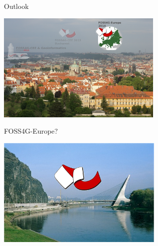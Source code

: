 \documentclass{beamer}
\begin{document}
\begin{frame}{Outlook}{}
  \begin{center}
    \includegraphics[height=200px]{imgs/outlook3.jpg}

  \end{center}
\end{frame}
\begin{frame}{FOSS4G-Europe?}{} \begin{center}
    \includegraphics[height=200px]{imgs/most.png}

  \end{center}
\end{frame}
\end{document}
